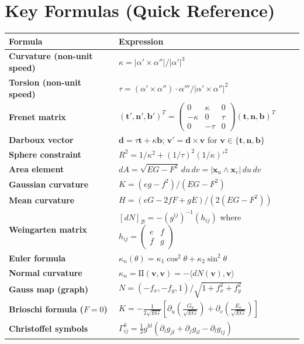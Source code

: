 \documentclass[11pt, a4paper]{article}
\newcommand{\mbf}[1]{\mathbf{#1}}
\newcommand{\kp}{\kappa}
\newcommand{\tp}{\tau}
\begin{document}
\section*{Key Formulas (Quick Reference)}

\begin{center}
\renewcommand{\arraystretch}{1.6}
\begin{tabular}{>{\bfseries}p{4.8cm} p{8.8cm}}
\toprule
Formula & Expression \\
\midrule
Curvature (non-unit speed) & $\kp=|\alpha'\times\alpha''|/|\alpha'|^3$ \\
Torsion (non-unit speed) & $\tp=(\alpha'\times\alpha'')\cdot\alpha'''/|\alpha'\times\alpha''|^2$ \\
Frenet matrix & $(\mbf{t}',\mbf{n}',\mbf{b}')^T=\begin{pmatrix}0&\kp&0\\-\kp&0&\tp\\0&-\tp&0\end{pmatrix}(\mbf{t},\mbf{n},\mbf{b})^T$ \\
Darboux vector & $\mbf{d}=\tp\mbf{t}+\kp\mbf{b}$; \quad $\mbf{v}'=\mbf{d}\times\mbf{v}$ for $\mbf{v}\in\{\mbf{t},\mbf{n},\mbf{b}\}$ \\
Sphere constraint & $R^2=1/\kp^2+(1/\tp)^2(1/\kp)'^2$ \\
Area element & $dA=\sqrt{EG-F^2}\,du\,dv=|\mathbf{x}_u\wedge\mathbf{x}_v|\,du\,dv$ \\
Gaussian curvature & $K=(eg-f^2)/(EG-F^2)$ \\
Mean curvature & $H=(eG-2fF+gE)/(2(EG-F^2))$ \\
Weingarten matrix & $[dN]_{\mathcal{B}}=-(g^{ij})^{-1}(h_{ij})$ where $h_{ij}=\begin{pmatrix}e&f\\f&g\end{pmatrix}$ \\
Euler formula & $\kp_n(\theta)=\kp_1\cos^2\theta+\kp_2\sin^2\theta$ \\
Normal curvature & $\kp_n=\mathrm{II}(\mathbf{v},\mathbf{v})=-\langle dN(\mathbf{v}),\mathbf{v}\rangle$ \\
Gauss map (graph) & $N=(-f_x,-f_y,1)/\sqrt{1+f_x^2+f_y^2}$ \\
Brioschi formula ($F=0$) & $K=-\frac{1}{2\sqrt{EG}}\left[\partial_u\!\left(\frac{G_u}{\sqrt{EG}}\right)+\partial_v\!\left(\frac{E_v}{\sqrt{EG}}\right)\right]$ \\
Christoffel symbols & $\Gamma_{ij}^k=\frac{1}{2}g^{kl}(\partial_ig_{jl}+\partial_jg_{il}-\partial_lg_{ij})$ \\

\end{tabular}
\end{center}
\end{document}
